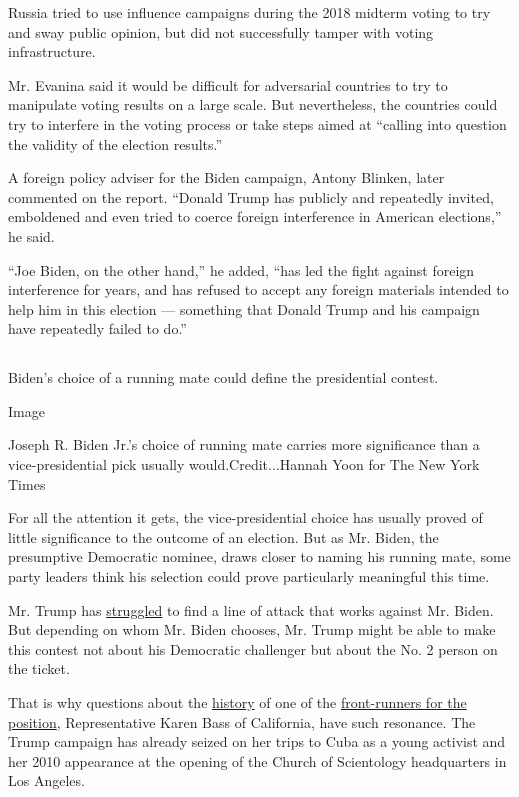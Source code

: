 Russia tried to use influence campaigns during the 2018 midterm voting
to try and sway public opinion, but did not successfully tamper with
voting infrastructure.

Mr. Evanina said it would be difficult for adversarial countries to try
to manipulate voting results on a large scale. But nevertheless, the
countries could try to interfere in the voting process or take steps
aimed at ``calling into question the validity of the election results.''

A foreign policy adviser for the Biden campaign, Antony Blinken, later
commented on the report. ``Donald Trump has publicly and repeatedly
invited, emboldened and even tried to coerce foreign interference in
American elections,'' he said.

``Joe Biden, on the other hand,'' he added, ``has led the fight against
foreign interference for years, and has refused to accept any foreign
materials intended to help him in this election --- something that
Donald Trump and his campaign have repeatedly failed to do.''

\hypertarget{section-1}{%
\subsection{}\label{section-1}}

Biden's choice of a running mate could define the presidential contest.

Image

Joseph R. Biden Jr.'s choice of running mate carries more significance
than a vice-presidential pick usually would.Credit...Hannah Yoon for The
New York Times

For all the attention it gets, the vice-presidential choice has usually
proved of little significance to the outcome of an election. But as Mr.
Biden, the presumptive Democratic nominee, draws closer to naming his
running mate, some party leaders think his selection could prove
particularly meaningful this time.

Mr. Trump has
\href{https://www.nytimes3xbfgragh.onion/2020/07/10/us/biden-trump.html}{struggled}
to find a line of attack that works against Mr. Biden. But depending on
whom Mr. Biden chooses, Mr. Trump might be able to make this contest not
about his Democratic challenger but about the No. 2 person on the
ticket.

That is why questions about the
\href{https://www.politico.com/news/2020/08/04/karen-bass-eulogized-communist-party-usa-leader-391455}{history}
of one of the
\href{https://www.nytimes3xbfgragh.onion/2020/08/04/us/politics/karen-bass-vice-president-biden.html}{front-runners
for the position}, Representative Karen Bass of California, have such
resonance. The Trump campaign has already seized on her trips to Cuba as
a young activist and her 2010 appearance at the opening of the Church of
Scientology headquarters in Los Angeles.

